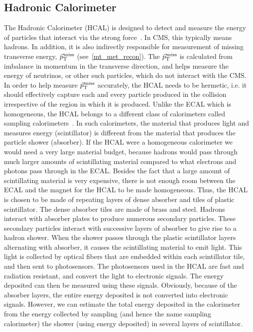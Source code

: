 \subsection{Hadronic Calorimeter}
\label{Hcal}
The Hadronic Calorimeter (HCAL) is designed to detect and measure the energy of particles that interact via the strong force~\cite{cms_exp_ref}. In CMS, this typically means hadrons. In addition, it is also indirectly responsible for measurement of missing transverse energy, ${\vec p}_{\mathrm{T}}^{\kern1pt\text{miss}}$ (see~\ref{mt_met_recon}). The ${\vec p}_{\mathrm{T}}^{\kern1pt\text{miss}}$ is calculated from imbalance in momentum in the transverse direction, and helps measure the energy of neutrinos, or other such particles, which do not interact with the CMS. In order to help measure ${\vec p}_{\mathrm{T}}^{\kern1pt\text{miss}}$ accurately, the HCAL needs to be hermetic, i.e. it should effectively capture each and every particle produced in the collision irrespective of the region in which it is produced. Unlike the ECAL which is homogeneous, the HCAL belongs to a different class of calorimeters called sampling calorimeters~\cite{hcal1}. In such calorimeters, the  material that produces light and measures energy (scintillator) is different from the material that produces the particle shower (absorber). If the HCAL were a homogeneous calorimeter we would need a very large material budget, because hadrons would pass through much larger amounts of scintillating material compared to what electrons and photons pass through in the ECAL. Besides the fact that a large amount of scintillating material is very expensive, there is not enough room between the ECAL and the magnet for the HCAL to be made homogeneous. Thus, the HCAL is chosen to be made of repeating layers of dense absorber and tiles of plastic scintillator. The dense absorber tiles are made of brass and steel. Hadrons interact with absorber plates to produce numerous secondary particles. These secondary particles interact with successive layers of absorber to give rise to a hadron shower. When the shower passes through the plastic scintillator layers alternating with absorber, it causes the scintillating material to emit light. This light is collected by optical fibers that are embedded within each scintillator tile, and then sent to photosensors. The photosensors used in the HCAL are fast and radiation resistant, and convert the light to electronic signals. The energy deposited can then be measured using these signals. Obviously, because of the absorber layers, the entire energy deposited is not converted into electronic signals. However, we can estimate the total energy deposited in the calorimeter from the energy collected by sampling (and hence the name sampling calorimeter) the shower (using  energy deposited) in several layers of scintillator.


